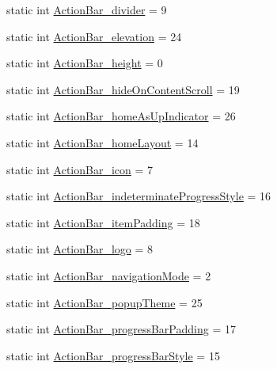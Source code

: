 \begin{DoxyCompactItemize}
\item 
static int \hyperlink{classandroid_1_1support_1_1design_1_1R_1_1styleable_a3de1d07d052e4c273b08980969a62a70}{Action\+Bar\+\_\+divider} = 9
\item 
static int \hyperlink{classandroid_1_1support_1_1design_1_1R_1_1styleable_a8e93fa7b188ab181bc2723837301eaff}{Action\+Bar\+\_\+elevation} = 24
\item 
static int \hyperlink{classandroid_1_1support_1_1design_1_1R_1_1styleable_a7e935cdf4fb18cfcd8e0e46a55688835}{Action\+Bar\+\_\+height} = 0
\item 
static int \hyperlink{classandroid_1_1support_1_1design_1_1R_1_1styleable_aaacf39cc520445677c982038b3f1c151}{Action\+Bar\+\_\+hide\+On\+Content\+Scroll} = 19
\item 
static int \hyperlink{classandroid_1_1support_1_1design_1_1R_1_1styleable_a99993170cd30fcfabe0a4cf22e1ab405}{Action\+Bar\+\_\+home\+As\+Up\+Indicator} = 26
\item 
static int \hyperlink{classandroid_1_1support_1_1design_1_1R_1_1styleable_a68a6be872a400b3a54e7392b5af0942c}{Action\+Bar\+\_\+home\+Layout} = 14
\item 
static int \hyperlink{classandroid_1_1support_1_1design_1_1R_1_1styleable_a356bb80ee476da75d83e098c4ba916e0}{Action\+Bar\+\_\+icon} = 7
\item 
static int \hyperlink{classandroid_1_1support_1_1design_1_1R_1_1styleable_aaaf61ddc78cf22a50998e89590c52198}{Action\+Bar\+\_\+indeterminate\+Progress\+Style} = 16
\item 
static int \hyperlink{classandroid_1_1support_1_1design_1_1R_1_1styleable_a78fa3cd1aaa0862234ec9dbe574b9ec8}{Action\+Bar\+\_\+item\+Padding} = 18
\item 
static int \hyperlink{classandroid_1_1support_1_1design_1_1R_1_1styleable_a2e3a0d864b97ab7733b49ad177a6e546}{Action\+Bar\+\_\+logo} = 8
\item 
static int \hyperlink{classandroid_1_1support_1_1design_1_1R_1_1styleable_a3b1d975d496c69cd5c70aa11b32bfacb}{Action\+Bar\+\_\+navigation\+Mode} = 2
\item 
static int \hyperlink{classandroid_1_1support_1_1design_1_1R_1_1styleable_ad9bc331aad9e2db0b8aae27b3c65b27a}{Action\+Bar\+\_\+popup\+Theme} = 25
\item 
static int \hyperlink{classandroid_1_1support_1_1design_1_1R_1_1styleable_a6016ed7a959c61f6ddc620a7a7b8c41f}{Action\+Bar\+\_\+progress\+Bar\+Padding} = 17
\item 
static int \hyperlink{classandroid_1_1support_1_1design_1_1R_1_1styleable_a3e9e3b6cbfbc94e8c2cf7b0dc31e1a87}{Action\+Bar\+\_\+progress\+Bar\+Style} = 15

\end{DoxyCompactItemize}
